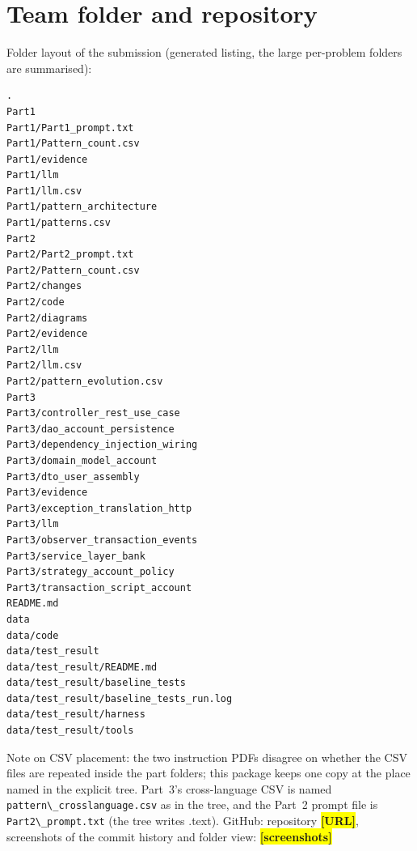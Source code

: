 \documentclass[11pt,a4paper]{article}
\newcommand{\ph}[1]{\colorbox{yellow}{\textbf{[#1]}}}
\begin{document}
\section{Team folder and repository}
Folder layout of the submission (generated listing, the large per-problem folders are summarised):
\begin{Verbatim}[fontsize=\scriptsize]
.
Part1
Part1/Part1_prompt.txt
Part1/Pattern_count.csv
Part1/evidence
Part1/llm
Part1/llm.csv
Part1/pattern_architecture
Part1/patterns.csv
Part2
Part2/Part2_prompt.txt
Part2/Pattern_count.csv
Part2/changes
Part2/code
Part2/diagrams
Part2/evidence
Part2/llm
Part2/llm.csv
Part2/pattern_evolution.csv
Part3
Part3/controller_rest_use_case
Part3/dao_account_persistence
Part3/dependency_injection_wiring
Part3/domain_model_account
Part3/dto_user_assembly
Part3/evidence
Part3/exception_translation_http
Part3/llm
Part3/observer_transaction_events
Part3/service_layer_bank
Part3/strategy_account_policy
Part3/transaction_script_account
README.md
data
data/code
data/test_result
data/test_result/README.md
data/test_result/baseline_tests
data/test_result/baseline_tests_run.log
data/test_result/harness
data/test_result/tools

\end{Verbatim}
Note on CSV placement: the two instruction PDFs disagree on whether the CSV files are repeated inside the part folders; this package keeps one copy at the place named in the explicit tree. Part~3's cross-language CSV is named \texttt{pattern\textbackslash{}\_\allowbreak{}crosslanguage.\allowbreak{}csv} as in the tree, and the Part~2 prompt file is \texttt{Part2\textbackslash{}\_\allowbreak{}prompt.\allowbreak{}txt} (the tree writes .text).
GitHub: repository \ph{URL}, screenshots of the commit history and folder view: \ph{screenshots}
\end{document}
